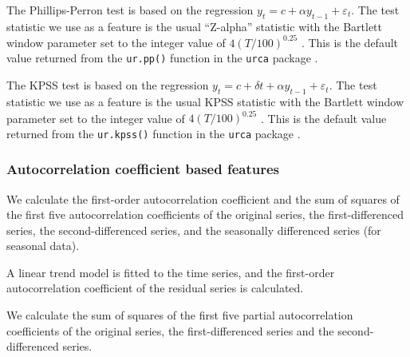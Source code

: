 \documentclass[11pt,a4paper,]{article}
\begin{document}
The Phillips-Perron test is based on the regression
\(y_t= c + \alpha y_{t-1}+ \varepsilon_t\). The test statistic we use as
a feature is the usual ``Z-alpha'' statistic with the Bartlett window
parameter set to the integer value of \(4(T/100)^{0.25}\)
\autocite{Pfaff2008}. This is the default value returned from the
\texttt{ur.pp()} function in the \texttt{urca} package
\autocite{pfaff2016package}.

The KPSS test is based on the regression
\(y_t=c+\delta t+\alpha y_{t-1}+\varepsilon_t\). The test statistic we
use as a feature is the usual KPSS statistic with the Bartlett window
parameter set to the integer value of \(4(T/100)^{0.25}\)
\autocite{Pfaff2008}. This is the default value returned from the
\texttt{ur.kpss()} function in the \texttt{urca} package
\autocite{pfaff2016package}.

\subsubsection*{Autocorrelation coefficient based
features}\label{autocorrelation-coefficient-based-features}

We calculate the first-order autocorrelation coefficient and the sum of
squares of the first five autocorrelation coefficients of the original
series, the first-differenced series, the second-differenced series, and
the seasonally differenced series (for seasonal data).

A linear trend model is fitted to the time series, and the first-order
autocorrelation coefficient of the residual series is calculated.

We calculate the sum of squares of the first five partial
autocorrelation coefficients of the original series, the
first-differenced series and the second-differenced series.

\printbibliography
\end{document}
